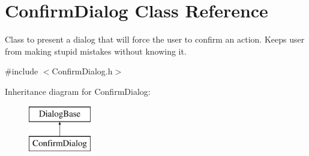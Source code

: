 \hypertarget{class_confirm_dialog}{
\section{ConfirmDialog Class Reference}
\label{class_confirm_dialog}
}


Class to present a dialog that will force the user to confirm an action. Keeps user from making stupid mistakes without knowing it.  




{\ttfamily \#include $<$ConfirmDialog.h$>$}

Inheritance diagram for ConfirmDialog:\begin{figure}[H]
\begin{center}
\leavevmode
\includegraphics[height=2.000000cm]{class_confirm_dialog}
\end{center}
\end{figure}
